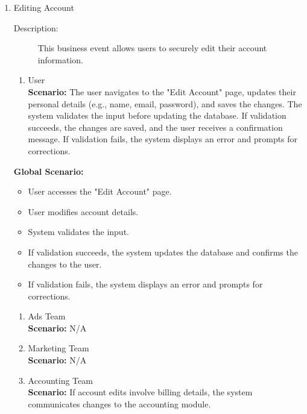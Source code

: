 \documentclass[]{article}
\begin{document}
\begin{enumerate}[{\bf BE5.}]
    \item Editing Account
    \begin{description}
        \item[Description:] This business event allows users to securely edit their account information.
    \end{description}
    
    \begin{enumerate}[{\bf VP1.}]
        \item User \\  
        \textbf{Scenario:} The user navigates to the "Edit Account" page, updates their personal details (e.g., name, email, password), and saves the changes.  
        The system validates the input before updating the database. If validation succeeds, the changes are saved, and the user receives a confirmation message.  
        If validation fails, the system displays an error and prompts for corrections.
    \end{enumerate}
    
    {\bf Global Scenario:}\\
    \begin{itemize}
        \item User accesses the "Edit Account" page.
        \item User modifies account details.
        \item System validates the input.
        \item If validation succeeds, the system updates the database and confirms the changes to the user.
        \item If validation fails, the system displays an error and prompts for corrections.
    \end{itemize}
    
    \begin{enumerate}[{\bf VP2.}]
        \item Ads Team \\  
        \textbf{Scenario:} N/A
        \item Marketing Team \\  
        \textbf{Scenario:} N/A
        \item Accounting Team \\  
        \textbf{Scenario:} If account edits involve billing details, the system communicates changes to the accounting module.
    \end{enumerate}
    

\end{enumerate}
\end{document}
